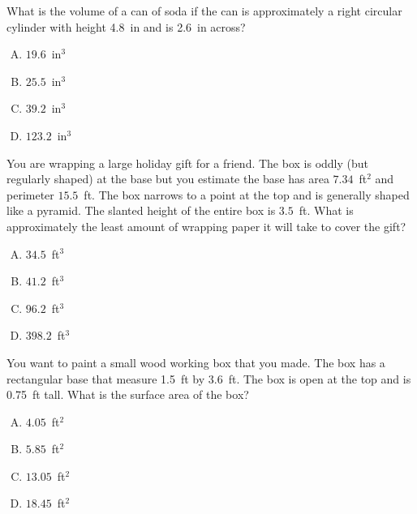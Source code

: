 \documentclass[12pt,letterpaper]{exam}
\begin{document}
\begin{questions}
\vfill



\question What is the volume of a can of soda if the can is approximately a right circular cylinder with height 4.8~in and is 2.6~in across?
        \begin{enumerate}[A.]
        \item $19.6$~in$^3$
        \item $25.5$~in$^3$ %
        \item $39.2$~in$^3$
        \item $123.2$~in$^3$
        \end{enumerate}



\newpage



\question You are wrapping a large holiday gift for a friend. The box is oddly (but regularly shaped) at the base but you estimate the base has area $7.34$~ft$^2$ and perimeter $15.5$~ft. The box narrows to a point at the top and is generally shaped like a pyramid. The slanted height of the entire box is $3.5$~ft. What is approximately the least amount of wrapping paper it will take to cover the gift?
        \begin{enumerate}[A.]
        \item $34.5$~ft$^3$
        \item $41.2$~ft$^3$
        \item $96.2$~ft$^3$ %
        \item $398.2$~ft$^3$
        \end{enumerate}



\vfill



\question You want to paint a small wood working box that you made. The box has a rectangular base that measure 1.5~ft by 3.6~ft. The box is open at the top and is 0.75~ft tall. What is the surface area of the box?
        \begin{enumerate}[A.]
        \item $4.05$~ft$^2$
        \item $5.85$~ft$^2$
        \item $13.05$~ft$^2$
        \item $18.45$~ft$^2$ %
        \end{enumerate}



\vfill




\end{questions}
\end{document}
